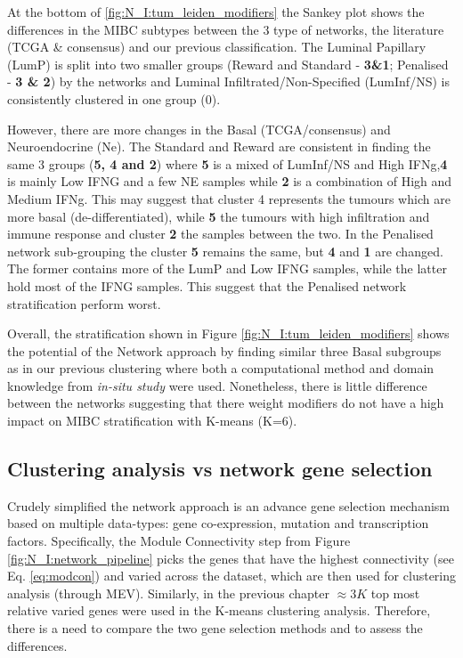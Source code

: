 At the bottom of \cref{fig:N_I:tum_leiden_modifiers} the Sankey plot shows the differences in the MIBC subtypes between the 3 type of networks, the literature (TCGA \& consensus) and our previous classification. The Luminal Papillary (LumP) is split into two smaller groups (Reward and Standard - \textbf{3\&1}; Penalised - \textbf{3 \& 2}) by the networks and Luminal Infiltrated/Non-Specified (LumInf/NS) is consistently clustered in one group (0). 

However, there are more changes in the Basal (TCGA/consensus) and Neuroendocrine (Ne). The Standard and Reward are consistent in finding the same 3 groups (\textbf{5, 4 and 2}) where \textbf{5} is a mixed of LumInf/NS and High IFNg,\textbf{4} is mainly Low IFNG and a few NE samples while \textbf{2} is a combination of High and Medium IFNg. This may suggest that cluster 4 represents the tumours which are more basal (de-differentiated), while \textbf{5} the tumours with high infiltration and immune response and cluster \textbf{2} the samples between the two. In the Penalised network sub-grouping the cluster \textbf{5} remains the same, but \textbf{4} and \textbf{1} are changed. The former contains more of the LumP and Low IFNG samples, while the latter hold most of the IFNG samples. This suggest that the Penalised network stratification perform worst.

Overall, the stratification shown in Figure \ref{fig:N_I:tum_leiden_modifiers} shows the potential of the Network approach by finding similar three Basal subgroups as in our previous clustering where both a computational method and domain knowledge from \textit{in-situ study} \citet{Baker2022-bj} were used. Nonetheless, there is little difference between the networks suggesting that there weight modifiers do not have a high impact on MIBC stratification with K-means (K=6).

\subsection{Clustering analysis vs network gene selection} \label{s:N_I:cs_vs_gene_sel}

Crudely simplified the network approach is an advance gene selection mechanism based on multiple data-types: gene co-expression, mutation and transcription factors. Specifically, the Module Connectivity step from Figure \ref{fig:N_I:network_pipeline} picks the genes that have the highest connectivity (see Eq. \ref{eq:modcon}) and varied across the dataset, which are then used for clustering analysis (through MEV). Similarly, in the previous chapter $\approx3K$ top most relative varied genes were used in the K-means clustering analysis. Therefore, there is a need to compare the two gene selection methods and to assess the differences.

